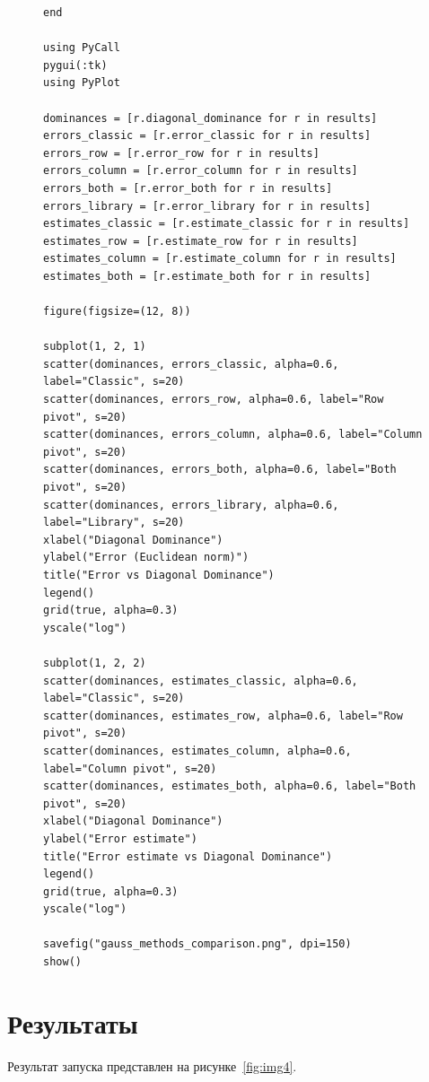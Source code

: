 \documentclass[a4paper, 14pt]{extarticle}
\begin{document}
\begin{figure}[!htb]
\begin{lstlisting}[language={},caption={Метод Гаусса (продолжение)},label={lst:code7}]
end

using PyCall
pygui(:tk)
using PyPlot

dominances = [r.diagonal_dominance for r in results]
errors_classic = [r.error_classic for r in results]
errors_row = [r.error_row for r in results]
errors_column = [r.error_column for r in results]
errors_both = [r.error_both for r in results]
errors_library = [r.error_library for r in results]
estimates_classic = [r.estimate_classic for r in results]
estimates_row = [r.estimate_row for r in results]
estimates_column = [r.estimate_column for r in results]
estimates_both = [r.estimate_both for r in results]

figure(figsize=(12, 8))

subplot(1, 2, 1)
scatter(dominances, errors_classic, alpha=0.6, label="Classic", s=20)
scatter(dominances, errors_row, alpha=0.6, label="Row pivot", s=20)
scatter(dominances, errors_column, alpha=0.6, label="Column pivot", s=20)
scatter(dominances, errors_both, alpha=0.6, label="Both pivot", s=20)
scatter(dominances, errors_library, alpha=0.6, label="Library", s=20)
xlabel("Diagonal Dominance")
ylabel("Error (Euclidean norm)")
title("Error vs Diagonal Dominance")
legend()
grid(true, alpha=0.3)
yscale("log")

subplot(1, 2, 2)
scatter(dominances, estimates_classic, alpha=0.6, label="Classic", s=20)
scatter(dominances, estimates_row, alpha=0.6, label="Row pivot", s=20)
scatter(dominances, estimates_column, alpha=0.6, label="Column pivot", s=20)
scatter(dominances, estimates_both, alpha=0.6, label="Both pivot", s=20)
xlabel("Diagonal Dominance")
ylabel("Error estimate")
title("Error estimate vs Diagonal Dominance")
legend()
grid(true, alpha=0.3)
yscale("log")

savefig("gauss_methods_comparison.png", dpi=150)
show()

\end{lstlisting}
\end{figure}

\clearpage
\section{Результаты}\label{Sect::res}

Результат запуска представлен на рисунке~\ref{fig:img4}.
\end{document}
